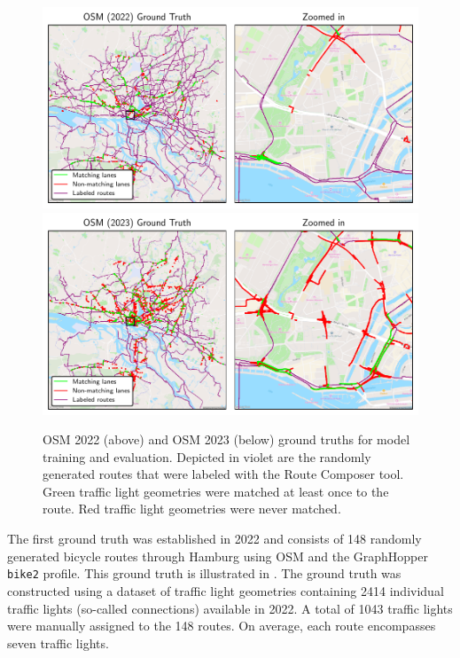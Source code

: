 \begin{figure}[!t]
\centering 
\includegraphics[width=\linewidth]{images/matching-ground-truth-osm-old.pdf} 
\\
\includegraphics[width=\linewidth]{images/matching-ground-truth-osm.pdf}
\caption{OSM 2022 (above) and OSM 2023 (below) ground truths for model training and evaluation. Depicted in violet are the randomly generated routes that were labeled with the Route Composer tool. Green traffic light geometries were matched at least once to the route. Red traffic light geometries were never matched.}
\label{fig:matching-ground-truth-osm-old}
\end{figure}

The first ground truth was established in 2022 and consists of 148 randomly generated bicycle routes through Hamburg using OSM and the GraphHopper \texttt{bike2} profile. This ground truth is illustrated in . The ground truth was constructed using a dataset of traffic light geometries containing 2414 individual traffic lights (so-called connections) available in 2022. A total of 1043 traffic lights were manually assigned to the 148 routes. On average, each route encompasses seven traffic lights.

